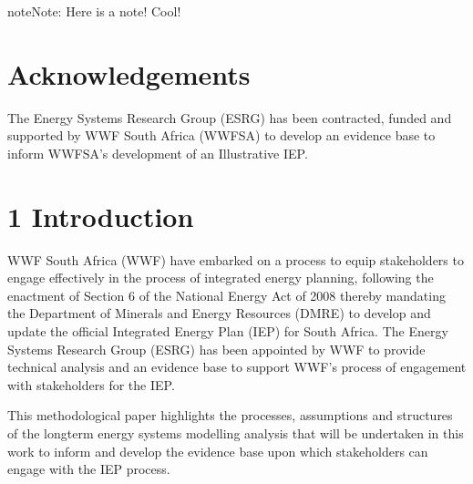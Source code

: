 \documentclass[letterpaper,10pt,english]{jupyterBook}
\begin{document}
\sphinxAtStartPar
{}

\begin{sphinxadmonition}{note}{Note:}
\sphinxAtStartPar
Here is a note! Cool!
\end{sphinxadmonition}

\sphinxstepscope


\chapter{Acknowledgements}
\label{\detokenize{00Acknowledgements:acknowledgements}}\label{\detokenize{00Acknowledgements::doc}}
\sphinxAtStartPar
The Energy Systems Research Group (ESRG) has been contracted, funded and supported by WWF South Africa (WWF\sphinxhyphen{}SA) to develop an evidence base to inform WWF\sphinxhyphen{}SA’s development of an Illustrative IEP.

\sphinxstepscope


\chapter{1 Introduction}
\label{\detokenize{01Introduction:introduction}}\label{\detokenize{01Introduction::doc}}
\sphinxAtStartPar
WWF South Africa (WWF) have embarked on a process to equip stakeholders to engage effectively in the process of integrated energy planning, following the enactment of Section 6 of the National Energy Act of 2008 thereby mandating the Department of Minerals and Energy Resources (DMRE) to develop and update the official Integrated Energy Plan (IEP) for South Africa. The Energy Systems Research Group (ESRG) has been appointed by WWF to provide technical analysis and an evidence base to support WWF’s process of engagement with stakeholders for the IEP.

\sphinxAtStartPar
This methodological paper highlights the processes, assumptions and structures of the long\sphinxhyphen{}term energy systems modelling analysis that will be undertaken in this work to inform and develop the evidence base upon which stakeholders can engage with the IEP process.
\end{document}
